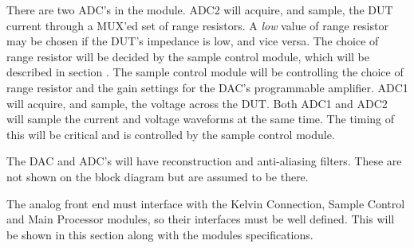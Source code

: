 There are two ADC's in the module. ADC2 will acquire, and sample, the DUT current through a MUX'ed set of range resistors. A \textit{low} value of range resistor may be chosen if the DUT's impedance is low, and vice versa. The choice of range resistor will be decided by the sample control module, which will be described in section . The sample control module will be controlling the choice of range resistor and the gain settings for the DAC's programmable amplifier. ADC1 will acquire, and sample, the voltage across the DUT. Both ADC1 and ADC2 will sample the current and voltage waveforms at the same time. The timing of this will be critical and is controlled by the sample control module.

The DAC and ADC's will have reconstruction and anti-aliasing filters. These are not shown on the block diagram but are assumed to be there.

The analog front end must interface with the Kelvin Connection, Sample Control and Main Processor modules, so their interfaces must be well defined. This will be shown in this section along with the modules specifications.

